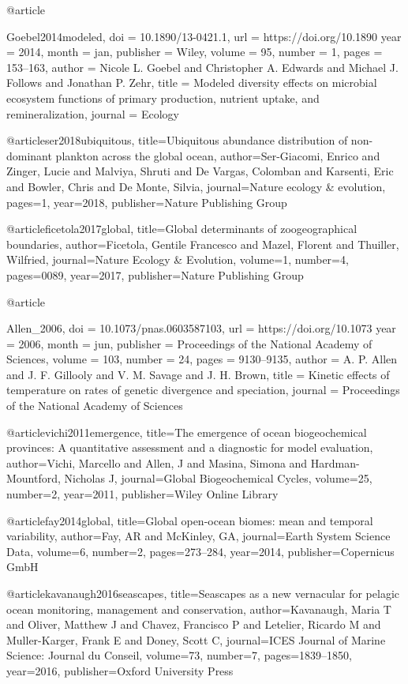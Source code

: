 {{{{{{{{{{{{{{{@article{Goebel2014modeled,
	doi = {10.1890/13-0421.1},
	url = {https://doi.org/10.1890%
	year = 2014,
	month = {jan},
	publisher = {Wiley},
	volume = {95},
	number = {1},
	pages = {153--163},
	author = {Nicole L. Goebel and Christopher A. Edwards and Michael J. Follows and Jonathan P. Zehr},
	title = {Modeled diversity effects on microbial ecosystem functions of primary production, nutrient uptake, and remineralization},
	journal = {Ecology}
}

@article{ser2018ubiquitous,
  title={Ubiquitous abundance distribution of non-dominant plankton across the global ocean},
  author={Ser-Giacomi, Enrico and Zinger, Lucie and Malviya, Shruti and De Vargas, Colomban and Karsenti, Eric and Bowler, Chris and De Monte, Silvia},
  journal={Nature ecology \& evolution},
  pages={1},
  year={2018},
  publisher={Nature Publishing Group}
}


@article{ficetola2017global,
  title={Global determinants of zoogeographical boundaries},
  author={Ficetola, Gentile Francesco and Mazel, Florent and Thuiller, Wilfried},
  journal={Nature Ecology \& Evolution},
  volume={1},
  number={4},
  pages={0089},
  year={2017},
  publisher={Nature Publishing Group}
}

@article{Allen_2006,
	doi = {10.1073/pnas.0603587103},
	url = {https://doi.org/10.1073%
	year = 2006,
	month = {jun},
	publisher = {Proceedings of the National Academy of Sciences},
	volume = {103},
	number = {24},
	pages = {9130--9135},
	author = {A. P. Allen and J. F. Gillooly and V. M. Savage and J. H. Brown},
	title = {Kinetic effects of temperature on rates of genetic divergence and speciation},
	journal = {Proceedings of the National Academy of Sciences}
}

@article{vichi2011emergence,
  title={The emergence of ocean biogeochemical provinces: A quantitative assessment and a diagnostic for model evaluation},
  author={Vichi, Marcello and Allen, J and Masina, Simona and Hardman-Mountford, Nicholas J},
  journal={Global Biogeochemical Cycles},
  volume={25},
  number={2},
  year={2011},
  publisher={Wiley Online Library}
}

@article{fay2014global,
  title={Global open-ocean biomes: mean and temporal variability},
  author={Fay, AR and McKinley, GA},
  journal={Earth System Science Data},
  volume={6},
  number={2},
  pages={273--284},
  year={2014},
  publisher={Copernicus GmbH}
}

@article{kavanaugh2016seascapes,
  title={Seascapes as a new vernacular for pelagic ocean monitoring, management and conservation},
  author={Kavanaugh, Maria T and Oliver, Matthew J and Chavez, Francisco P and Letelier, Ricardo M and Muller-Karger, Frank E and Doney, Scott C},
  journal={ICES Journal of Marine Science: Journal du Conseil},
  volume={73},
  number={7},
  pages={1839--1850},
  year={2016},
  publisher={Oxford University Press}
}

}}}}}}}}}}}}}}}}}
